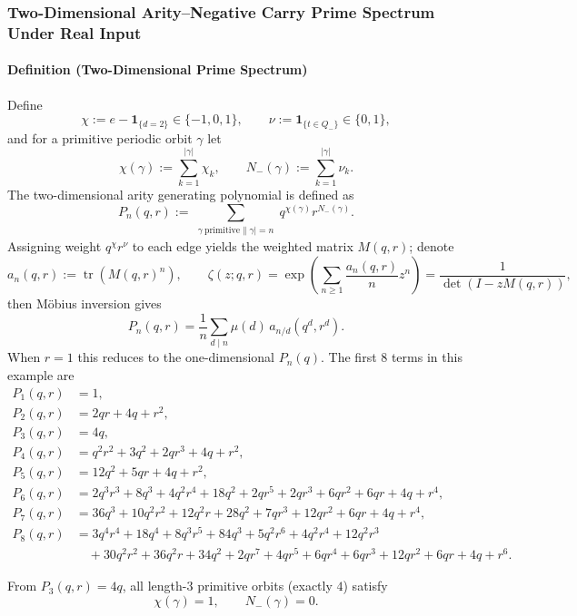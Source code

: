 \subsubsection{Two-Dimensional Arity--Negative Carry Prime Spectrum Under Real Input}\label{app:real-input-40-arity-2d}
\paragraph{Definition (Two-Dimensional Prime Spectrum)}
Define
\[
\chi:=e-\mathbf{1}_{\{d=2\}}\in\{-1,0,1\},
\qquad
\nu:=\mathbf{1}_{\{t\in Q_-\}}\in\{0,1\},
\]
and for a primitive periodic orbit $\gamma$ let
\[
\chi(\gamma):=\sum_{k=1}^{|\gamma|}\chi_k,\qquad
N_-(\gamma):=\sum_{k=1}^{|\gamma|}\nu_k.
\]
The two-dimensional arity generating polynomial is defined as
\[
P_n(q,r):=\sum_{\substack{\gamma\ \mathrm{primitive}\|\gamma|=n}} q^{\chi(\gamma)}r^{N_-(\gamma)}.
\]
Assigning weight $q^\chi r^\nu$ to each edge yields the weighted matrix $M(q,r)$; denote
\[
a_n(q,r):=\operatorname{tr}(M(q,r)^n),\qquad
\zeta(z;q,r)=\exp\!\left(\sum_{n\ge 1}\frac{a_n(q,r)}{n}z^n\right)
=\frac{1}{\det(I-zM(q,r))},
\]
then M\"obius inversion gives
\[
P_n(q,r)=\frac{1}{n}\sum_{d\mid n}\mu(d)\,a_{n/d}(q^d,r^d).
\]
When $r=1$ this reduces to the one-dimensional $P_n(q)$. The first $8$ terms in this example are
\[
\begin{aligned}
P_1(q,r)&=1,\\
P_2(q,r)&=2qr+4q+r^{2},\\
P_3(q,r)&=4q,\\
P_4(q,r)&=q^{2}r^{2}+3q^{2}+2qr^{3}+4q+r^{2},\\
P_5(q,r)&=12q^{2}+5qr+4q+r^{2},\\
P_6(q,r)&=2q^{3}r^{3}+8q^{3}+4q^{2}r^{4}+18q^{2}+2qr^{5}+2qr^{3}+6qr^{2}+6qr+4q+r^{4},\\
P_7(q,r)&=36q^{3}+10q^{2}r^{2}+12q^{2}r+28q^{2}+7qr^{3}+12qr^{2}+6qr+4q+r^{4},\\
P_8(q,r)&=3q^{4}r^{4}+18q^{4}+8q^{3}r^{5}+84q^{3}+5q^{2}r^{6}+4q^{2}r^{4}+12q^{2}r^{3}\\
&\quad+30q^{2}r^{2}+36q^{2}r+34q^{2}+2qr^{7}+4qr^{5}+6qr^{4}+6qr^{3}+12qr^{2}+6qr+4q+r^{6}.
\end{aligned}
\]
\begin{corollary}\label{cor:real-input-40-arity-2d-rigidity-n3}
From \(P_3(q,r)=4q\), all length-$3$ primitive orbits (exactly $4$) satisfy
\[
\chi(\gamma)=1,\qquad N_-(\gamma)=0.
\]
\end{corollary}

